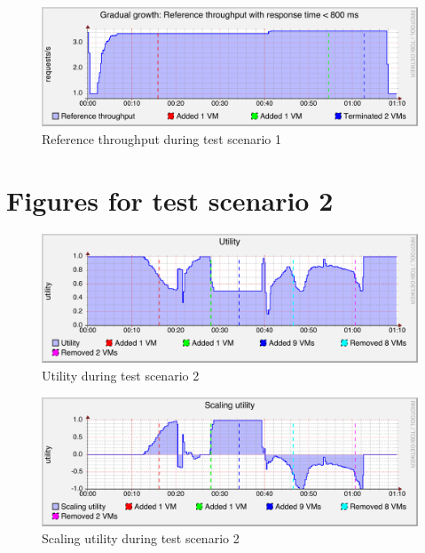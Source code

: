\documentclass[english]{tktltiki2}
\theoremstyle{definition}
\theoremstyle{remark}
\begin{document}
\begin{figure}[htbp]
	\includegraphics[width=\textwidth]{images/referencethroughputgraph-test21}
	\caption{Reference throughput during test scenario 1}
	\label{fig:referenceThroughputScenario1}
\end{figure}

\clearpage

\section{Figures for test scenario 2}

\begin{figure}[htbp]
	\includegraphics[width=\textwidth]{images/utilitygraph-test23}
	\caption{Utility during test scenario 2}
	\label{fig:utilityScenario2}
\end{figure}

\begin{figure}[htbp]
	\includegraphics[width=\textwidth]{images/scalingutilitygraph-test23}
	\caption{Scaling utility during test scenario 2}
	\label{fig:scalingUtilityScenario2}
\end{figure}
\end{document}
